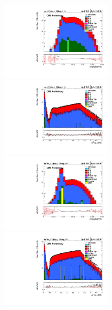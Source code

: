 \documentclass[oneside, a4paper, 11pt, ]{report}
\begin{document}
\begin{figure}
\includegraphics[width=0.5\textwidth]{Plots/ControlPlots/TTbarDiLeptonAnalysis/MuMu/Photons/AllPhotons/Log/Photon_sigma_ietaieta_barrel_splitTTbar_ratio.pdf}
\includegraphics[width=0.5\textwidth]{Plots/ControlPlots/TTbarDiLeptonAnalysis/MuMu/Photons/AllPhotons/Log/Photon_deltaR_jets_splitTTbar_ratio.pdf}\\
\includegraphics[width=0.5\textwidth]{Plots/ControlPlots/TTbarDiLeptonAnalysis/EE/Photons/AllPhotons/Log/Photon_sigma_ietaieta_barrel_splitTTbar_ratio.pdf}
\includegraphics[width=0.5\textwidth]{Plots/ControlPlots/TTbarDiLeptonAnalysis/EE/Photons/AllPhotons/Log/Photon_deltaR_jets_splitTTbar_ratio.pdf}\\

\end{figure}
\end{document}
